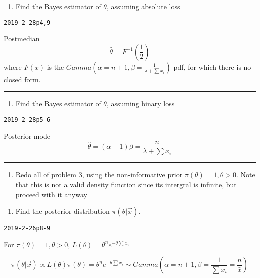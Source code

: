 \documentclass[12pt,]{article}
\providecommand{\tightlist}{%
  \setlength{\itemsep}{0pt}\setlength{\parskip}{0pt}}
\begin{document}
\begin{enumerate}
\def\labelenumi{\alph{enumi}.}
\setcounter{enumi}{3}
\tightlist
\item
  \textcolor[rgb]{0.5,0.5,0.5}{Find the Bayes estimator of $\theta$, assuming absolute loss}
\end{enumerate}

\texttt{2019-2-28p4,9}

Postmedian \[\hat\theta=F^{-1}(\frac12)\] where \(F(x)\) is the
\(Gamma(\alpha=n+1,\beta=\frac1{\lambda+\sum x_i})\) pdf, for which
there is no closed form.

\begin{center}\rule{0.5\linewidth}{\linethickness}\end{center}

\begin{enumerate}
\def\labelenumi{\alph{enumi}.}
\setcounter{enumi}{4}
\tightlist
\item
  \textcolor[rgb]{0.5,0.5,0.5}{Find the Bayes estimator of $\theta$, assuming binary loss}
\end{enumerate}

\texttt{2019-2-28p5-6}

Posterior mode \[\hat\theta=(\alpha-1)\beta=\frac{n}{\lambda+\sum x_i}\]

\begin{center}\rule{0.5\linewidth}{\linethickness}\end{center}

\begin{enumerate}
\def\labelenumi{\arabic{enumi}.}
\setcounter{enumi}{3}
\tightlist
\item
  \textcolor[rgb]{0.5,0.5,0.5}{Redo all of problem 3, using the non-informative prior $\pi(\theta)=1,\theta>0$. Note that this is not a valid density function since its intergral is infinite, but proceed with it anyway}
\end{enumerate}

\begin{enumerate}
\def\labelenumi{\alph{enumi}.}
\tightlist
\item
  \textcolor[rgb]{0.5,0.5,0.5}{Find the posterior distribution $\pi(\theta|\vec x)$.}
\end{enumerate}

\texttt{2019-2-26p8-9}

For \(\pi(\theta)=1,\theta>0\),
\(L(\theta)=\theta^n e^{-\theta\sum x_i}\)

\[\pi(\theta|\vec x)\propto L(\theta)\pi(\theta)=\theta^n e^{-\theta\sum x_i}\sim Gamma(\alpha=n+1,\beta=\frac1{\sum x_i}=\frac{n}{\bar x})\]
\end{document}
